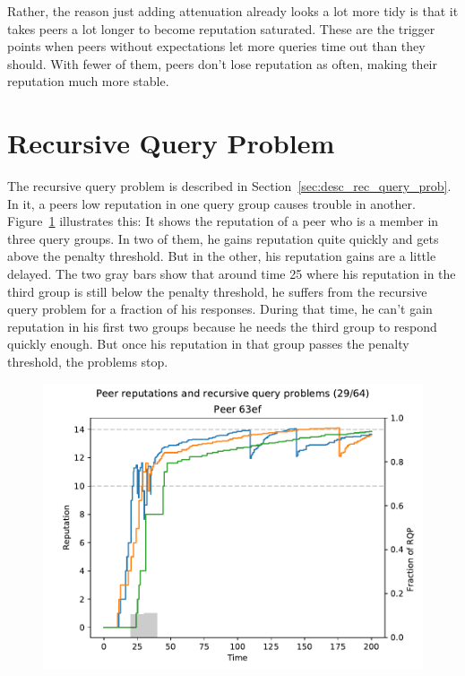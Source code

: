 Rather, the reason just adding attenuation already looks a lot more tidy is that
it takes peers a lot longer to become reputation saturated. These are the
trigger points when peers without expectations let more queries time out than
they should. With fewer of them, peers don't lose reputation as often, making
their reputation much more stable.

\section{Recursive Query Problem}
\label{sec:rep_avail_rec_query_prob}
The recursive query problem is described in
Section~\ref{sec:desc_rec_query_prob}.  In it, a peers low reputation in one
query group causes trouble in another.  Figure~\ref{fig:rec_query_prob}
illustrates this: It shows the reputation of a peer who is a member in three
query groups. In two of them, he gains reputation quite quickly and gets above
the penalty threshold. But in the other, his reputation gains are a little
delayed. The two gray bars show that around time 25 where his reputation in the
third group is still below the penalty threshold, he suffers from the recursive
query problem for a fraction of his responses.  During that time, he can't gain
reputation in his first two groups because he needs the third group to respond
quickly enough. But once his reputation in that group passes the penalty
threshold, the problems stop.

\begin{figure}[t]
\centering
\includegraphics[width=1\columnwidth]{figures/selection_overlap_rep_sorted_peer_reps_with_rqp_29_of_64}
\label{fig:rec_query_prob}
\end{figure}

